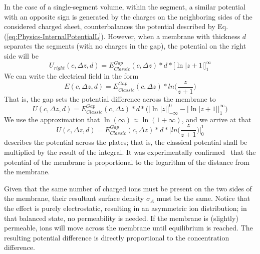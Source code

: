 In the case of a single-segment volume, within the segment, a similar potential with an opposite sign is generated by the charges on the neighboring sides of the considered charged sheet,
counterbalances the potential described by Eq.(\ref{eq:Physics-InternalPotentialL}). However, when a membrane with thickness $d$ separates the segments (with no charges in the gap), the potential on the right side will be
\begin{equation}
	U_{right}(c,\Delta z,d)
	= E^{Gap}_{Classic}(c,\Delta z) * d *\biggl[\ln | z+1 | \biggr]_{1}^{\infty}\label{eq:Physics-InternalPotentialR}
\end{equation}
\noindent
We can write the electrical field in the form
\begin{equation}
	E(c,\Delta z,d)=
	E^{Gap}_{Classic}(c,\Delta z)*ln\biggl(\frac{z}{z+1}\biggr)
	\label{eq:ElectricFieldOutside}
\end{equation}
That is, the gap sets the potential difference across the membrane to
\begin{equation}
	U(c,\Delta z,d)=
	E^{Gap}_{Classic}(c,\Delta z) *d *\biggl(\biggl[\ln | z | \biggr]_{-\infty}^{0}-\biggl[\ln | z+1 | \biggr]_{1}^{\infty}\biggr)\label{eq:Physics-InternalPotentialFunction}
\end{equation}
We use the approximation that $\ln(\infty)\approx \ln(1+\infty)$,
and we arrive at that
\begin{equation}
	U(c,\Delta z,d)=E^{Gap}_{Classic}(c,\Delta z)*d*\biggl[ln\biggl(\frac{z}{z+1}\biggr)\biggr]_{0}^{1}\label{eq:Physics-Internal1 }
\end{equation}
\noindent describes the potential across the plates; that is,
the classical potential shall be multiplied by the result of the integral. It was experimentally confirmed~\cite{DonnanPotentialExperiental:2022} that the potential 
of the membrane is proportional to the logarithm of the distance from the membrane.
\else

\fi


\ifx\magyar\undefined

Given that the same number of charged ions must be present
on the two sides of the membrane, their resultant surface density $\sigma_A$ must be the same. 
Notice that the effect is purely electrostatic, resulting in an asymmetric ion distribution; in that balanced state, no permeability is needed. If the membrane is (slightly) permeable, ions will
move across the membrane until equilibrium is reached.
The resulting potential difference is directly proportional to the concentration difference.


